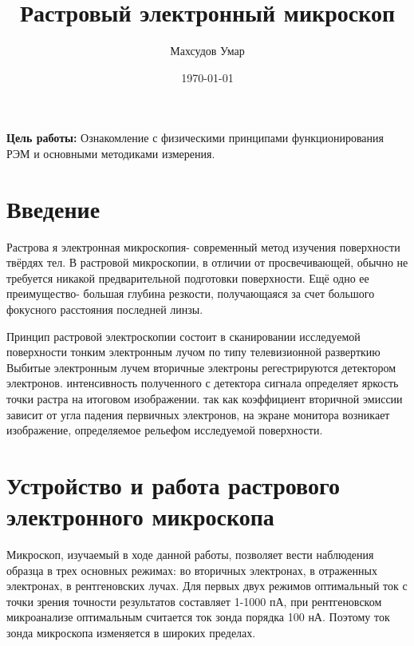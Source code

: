 \documentclass[a4paper,12pt]{article}
\author{Махсудов Умар}
\title{Растровый электронный микроскоп}
\date{\today}
\theoremstyle{plain} %
\theoremstyle{definition} %
\theoremstyle{remark} %
\begin{document}
	\maketitle
	\textbf{Цель работы:} Ознакомление с физическими принципами функционирования РЭМ и основными методиками измерения.
	\section{Введение}
	Растрова я электронная микроскопия- современный метод изучения поверхности твёрдях тел. В растровой микроскопии, в отличии от просвечивающей, обычно не требуется никакой предварительной подготовки поверхности. Ещё одно ее преимущество- большая глубина резкости, получающаяся за счет большого фокусного расстояния последней линзы.
	
	Принцип растровой электроскопии состоит в сканировании исследуемой поверхности тонким электронным лучом по типу телевизионной разверткию Выбитые электронным лучем вторичные электроны регестрируются детектором электронов. интенсивность полученного с детектора сигнала определяет яркость точки растра на итоговом изображении. так как коэффициент вторичной эмиссии зависит от угла падения первичных электронов, на экране монитора возникает изображение, определяемое рельефом исследуемой поверхности.
	\section{Устройство и работа растрового электронного микроскопа}
	Микроскоп, изучаемый в ходе данной работы, позволяет вести наблюдения образца в трех основных режимах: во вторичных электронах, в отраженных электронах, в рентгеновских лучах. Для первых двух режимов оптимальный ток с точки зрения точности результатов составляет 1-1000 пА, при рентгеновском микроанализе оптимальным считается ток зонда порядка 100 нА. Поэтому ток зонда микроскопа изменяется в широких пределах.
	
\end{document}
